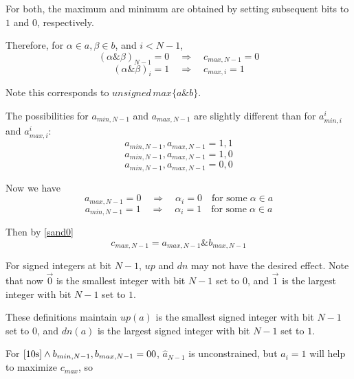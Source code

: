 \documentclass{article}
\begin{document}
For both, the maximum and minimum are obtained by setting 
subsequent bits to $1$ and $0$, respectively. 

Therefore, for $\alpha \in a, \beta \in b$, and $i < N-1$,
\begin{equation} \label{sand0}
(\alpha \& \beta)_{N-1} = 0 \quad \Rightarrow \quad c_{max, N-1} = 0
\end{equation}
\begin{equation}
(\alpha\&\beta)_i = 1 \quad \Rightarrow \quad 
c_{max,i} = 1
\end{equation}

Note this corresponds to $unsigned \, max\{a\&b\}$.

The possibilities for $a_{min,N-1}$ and $a_{max,N-1}$ are 
slightly different 
than for $a^i_{min,i}$ and $a^i_{max,i}$:
\begin{equation}\label{11s} 
a_{min,N-1},a_{max,N-1} = 1,1
\end{equation}
\begin{equation}\label{10s} 
a_{min,N-1},a_{max,N-1} = 1,0
\end{equation}
\begin{equation}\label{00s} 
a_{min,N-1}, a_{max,N-1} = 0,0
\end{equation}

Now we have
\begin{equation}\label{sup1}
a_{max,N-1} = 0 \quad \Rightarrow \quad \alpha_i = 0 \quad 
\text{for some} \; \alpha \in a
\end{equation}
\begin{equation}\label{sdn1}
a_{min,N-1} = 1 \quad \Rightarrow \quad \alpha_i = 1 \quad 
\text{for some} \; \alpha \in a
\end{equation}

Then by \eqref{sand0}
\begin{equation*}
c_{max,N-1} = a_{max,N-1} \& b_{max,N-1}
\end{equation*}

For signed integers at bit $N-1$, $up$ and $dn$ may not have the desired 
effect. Note that now $\vec 0$ is the smallest integer with bit $N-1$ set 
to $0$, and $\vec 1$ is the largest integer with bit $N-1$ set to $1$.

These definitions maintain $up(a)$ is the smallest signed integer with bit 
$N-1$ set to $0$, and $dn(a)$ is the largest signed integer with bit 
$N-1$ set to $1$.

For $\eqref{10s} \wedge b_{min,N-1},b_{max,N-1} = 00$, $\hat a_{N-1}$ is unconstrained,
but $a_i = 1$ will help to maximize $c_{max}$, so
\end{document}
